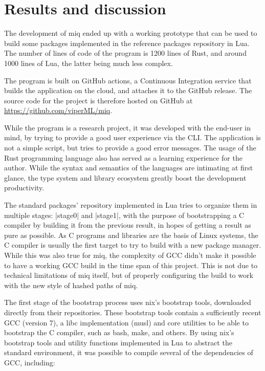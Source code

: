 \FloatBarrier
\chapter{Results and discussion}

The development of miq ended up with a working prototype
that can be used to build some packages implemented
in the reference packages repository in Lua. The number of
lines of code of the program is 1200 lines of Rust, and
around 1000 lines of Lua, the latter being much less
complex.

The program is built on GitHub actions, a Continuous
Integration service that builds the application on the
cloud, and attaches it to the GitHub release. The source
code for the project is therefore hosted on GitHub at \url{https://github.com/viperML/miq}.

While the program is a research project, it was developed
with the end-user in mind, by trying to provide a good user
experience via the \ac{CLI}. The application is not a simple
script, but tries to provide a good error messages. The
usage of the Rust programming language also has served as a
learning experience for the author. While the syntax and
semantics of the languages are intimating at first glance,
the type system and library ecosystem greatly boost the
development productivity.

The standard packages' repository implemented in Lua tries
to organize them in multiple stages: |stage0| and |stage1|,
with the purpose of bootstrapping a C compiler by building
it from the previous result, in hopes of getting a result as
pure as possible. As C programs and libraries are the basis
of Linux systems, the C compiler is usually the first target
to try to build with a new package manager. While this was
also true for miq, the complexity of GCC didn't make it
possible to have a working GCC build in the time span of
this project. This is not due to technical limitations of
miq itself, but of properly configuring the build to work
with the new style of hashed paths of miq.

The first stage of the bootstrap process uses nix's
bootstrap tools, downloaded directly from their
repositories. These bootstrap tools contain a sufficiently
recent GCC (version 7), a libc implementation (musl) and
core utilities to be able to bootstrap the C compiler, such
as bash, make, and others. By using nix's bootstrap tools
and utility functions implemented in Lua to abstract the
standard environment, it was possible to compile several of
the dependencies of GCC, including:

